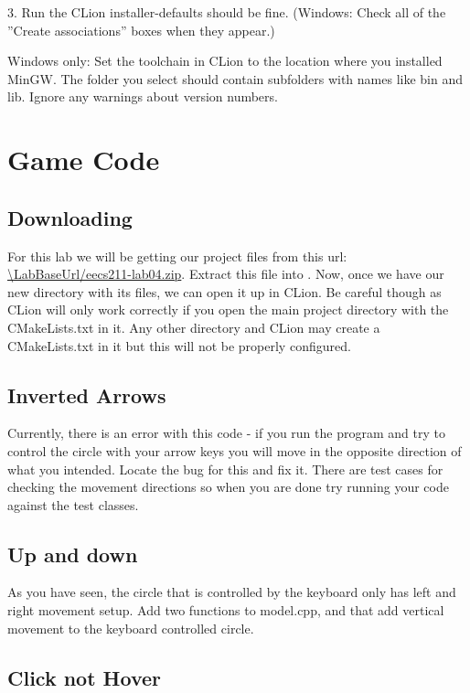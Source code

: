 \documentclass{tufte-handout}
\def\ThisLabBase{eecs211-lab04}
\def\ThisLabUrl{\LabBaseUrl/\ThisLabBase.zip}
\begin{document}
3. Run the CLion installer-defaults should be fine. (Windows: Check all
of the ''Create associations'' boxes when they appear.)

Windows only: Set the toolchain in CLion to the location where you
installed MinGW. The folder you select should contain subfolders with
names like bin and lib. Ignore any warnings about version numbers.

\section{Game Code}

\subsection{Downloading}

For this lab we will be getting our project files from this url:
\url{\ThisLabUrl}. Extract this file into \filename{\ThisLabBase}.
Now, once we have our new directory \filename{\ThisLabBase} with its
files, we can open it up in CLion. Be careful though as CLion will
only work correctly if you open the main project directory with the
CMakeLists.txt in it. Any other directory and CLion may create a
CMakeLists.txt in it but this will not be properly configured.

\subsection{Inverted Arrows}

Currently, there is an error with this code - if you run the program
and try to control the circle with your arrow keys you will move in the
opposite direction of what you intended. Locate the bug for this and fix
it. There are test cases for checking the movement directions so when you
are done try running your code against the test classes.

\subsection{Up and down}

As you have seen, the circle that is controlled by the keyboard only has
left and right movement setup. Add two functions to model.cpp,
 and
 that add vertical movement to
the keyboard controlled circle.

\subsection{Click not Hover}
\end{document}
